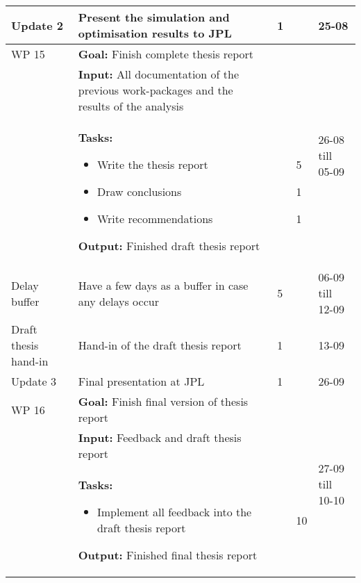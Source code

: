\begin{longtable}{|p{2cm}|p{10cm}|p{1cm}|p{1cm}|}
Update 2 & Present the simulation and optimisation results to \ac{JPL} & 1 & 25-08\\ \hline


WP 15 & \textbf{Goal:} Finish complete thesis report &  & \multirow{3}{1cm}{26-08 till 05-09}  \\ 
&\textbf{Input:} All documentation of the previous work-packages and the results of the analysis & & \\
& \textbf{Tasks:}
\begin{itemize}
\item Write the thesis report
\item Draw conclusions
\item Write recommendations
\end{itemize} 
\textbf{Output:} Finished draft thesis report & \noindent \begin{itemize}[leftmargin=*]
\item[5]
\item[1] 
\item[1]
\end{itemize} & \\ \hline

Delay buffer & Have a few days as a buffer in case any delays occur & 5 & 06-09 till 12-09 \\ \hline



Draft thesis hand-in 	& Hand-in of the draft thesis report & 1 & 13-09 \\ \hline \hline




Update 3 & Final presentation at \ac{JPL} & 1 & 26-09\\ \hline

WP 16 & \textbf{Goal:} Finish final version of thesis report &  & \multirow{3}{1cm}{27-09 till 10-10}  \\ 
&\textbf{Input:} Feedback and draft thesis report & & \\
& \textbf{Tasks:}
\begin{itemize}
\item Implement all feedback into the draft thesis report
\end{itemize} 
\textbf{Output:} Finished final thesis report & \noindent \begin{itemize}[leftmargin=*]
\item[10]
\end{itemize} & \\ \hline


\end{longtable}
